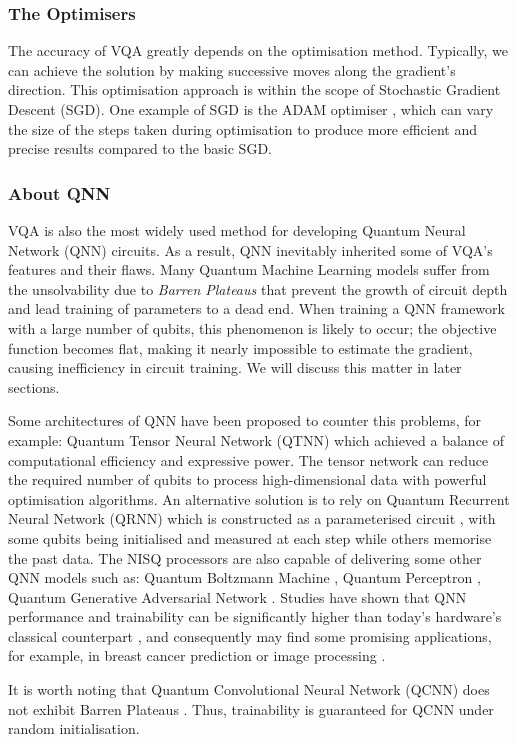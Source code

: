 \subsubsection{The Optimisers}
The accuracy of VQA greatly depends on the optimisation method.
Typically, we can achieve the solution by making successive moves along the gradient's direction.
This optimisation approach is within the scope of Stochastic Gradient Descent (SGD).
One example of SGD is the ADAM optimiser \cite{kingmaAdamMethodStochastic2014}, which can vary the size of the steps taken during optimisation to produce more efficient and precise results compared to the basic SGD.


\subsubsection{About QNN}
VQA is also the most widely used method for developing Quantum Neural Network (QNN) circuits. 
As a result, QNN inevitably inherited some of VQA's features and their flaws.
Many Quantum Machine Learning models suffer from the unsolvability due to \textit{Barren Plateaus} \cite{zhaoReviewQuantumNeural2021} that prevent the growth of circuit depth and lead training of parameters to a dead end.
When training a QNN framework with a large number of qubits, this phenomenon is likely to occur; the objective function becomes flat, making it nearly impossible to estimate the gradient, \cite{mccleanBarrenPlateausQuantum2018, zhaoAnalyzingBarrenPlateau2021} causing inefficiency in circuit training. 
We will discuss this matter in later sections.

Some architectures of QNN have been proposed to counter this problems, for example: 
Quantum Tensor Neural Network (QTNN) \cite{hugginsQuantumMachineLearning2019} which achieved a balance of computational efficiency and expressive power. 
The tensor network can reduce the required number of qubits to process high-dimensional data with powerful optimisation algorithms.
An alternative solution is to rely on Quantum Recurrent Neural Network (QRNN) which is constructed as a parameterised circuit \cite{takakiLearningTemporalData2021}, with some qubits being initialised and measured at each step while others memorise the past data.
The NISQ processors are also capable of delivering some other QNN models such as: 
Quantum Boltzmann Machine \cite{shinguBoltzmannMachineLearning2021, zoufalVariationalQuantumBoltzmann2021}, 
Quantum Perceptron \cite{kristensenArtificialSpikingQuantum2021}, 
Quantum Generative Adversarial Network \cite{dallaire-demersQuantumGenerativeAdversarial2018, lloydQuantumGenerativeAdversarial2018}. 
Studies have shown that QNN performance and trainability can be significantly higher than today's hardware's classical counterpart \cite{abbasPowerQuantumNeural2021, colesSeekingQuantumAdvantage2021}, and consequently may find some promising applications, for example, in breast cancer prediction \cite{liModelAlgorithmQuantuminspired2014} or image processing \cite{matsuiQubitNeuralNetwork2009}.

It is worth noting that Quantum Convolutional Neural Network (QCNN) does not exhibit Barren Plateaus \cite{pesahAbsenceBarrenPlateaus2021}.
Thus, trainability is guaranteed for QCNN under random initialisation.